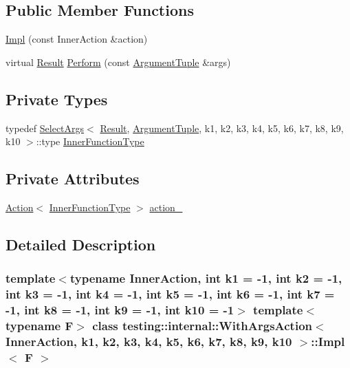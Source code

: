 \subsection*{Public Member Functions}
\begin{DoxyCompactItemize}
\item 
\hyperlink{classtesting_1_1internal_1_1WithArgsAction_1_1Impl_aab6b18195f0fd54de815bbc6379fc8c9}{Impl} (const Inner\+Action \&action)
\item 
virtual \hyperlink{classtesting_1_1ActionInterface_a7477de2fe3e4e01c59db698203acaee7}{Result} \hyperlink{classtesting_1_1internal_1_1WithArgsAction_1_1Impl_acdcb2f73c3f54e9ea639d9157d3f4e7c}{Perform} (const \hyperlink{classtesting_1_1ActionInterface_af72720d864da4d606629e83edc003511}{Argument\+Tuple} \&args)
\end{DoxyCompactItemize}
\subsection*{Private Types}
\begin{DoxyCompactItemize}
\item 
typedef \hyperlink{classtesting_1_1internal_1_1SelectArgs}{Select\+Args}$<$ \hyperlink{classtesting_1_1ActionInterface_a7477de2fe3e4e01c59db698203acaee7}{Result}, \hyperlink{classtesting_1_1ActionInterface_af72720d864da4d606629e83edc003511}{Argument\+Tuple}, k1, k2, k3, k4, k5, k6, k7, k8, k9, k10 $>$\+::type \hyperlink{classtesting_1_1internal_1_1WithArgsAction_1_1Impl_a19859cc3f545dc2a988638d4c2ca1fee}{Inner\+Function\+Type}
\end{DoxyCompactItemize}
\subsection*{Private Attributes}
\begin{DoxyCompactItemize}
\item 
\hyperlink{classtesting_1_1Action}{Action}$<$ \hyperlink{classtesting_1_1internal_1_1WithArgsAction_1_1Impl_a19859cc3f545dc2a988638d4c2ca1fee}{Inner\+Function\+Type} $>$ \hyperlink{classtesting_1_1internal_1_1WithArgsAction_1_1Impl_aa36bb75797d43eb853a92f02ca3e0dec}{action\+\_\+}
\end{DoxyCompactItemize}


\subsection{Detailed Description}
\subsubsection*{template$<$typename Inner\+Action, int k1 = -\/1, int k2 = -\/1, int k3 = -\/1, int k4 = -\/1, int k5 = -\/1, int k6 = -\/1, int k7 = -\/1, int k8 = -\/1, int k9 = -\/1, int k10 = -\/1$>$\newline
template$<$typename F$>$\newline
class testing\+::internal\+::\+With\+Args\+Action$<$ Inner\+Action, k1, k2, k3, k4, k5, k6, k7, k8, k9, k10 $>$\+::\+Impl$<$ F $>$}



